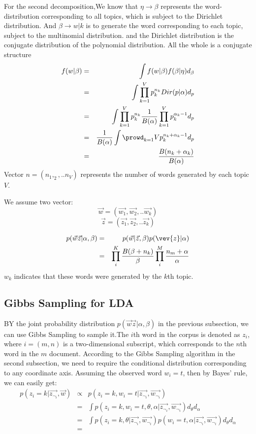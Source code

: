 For the second decomposition,We know that $\eta \rightarrow \beta$ represents the word-distribution corresponding to all topics, which is subject to the Dirichlet distribution. And $\beta  \rightarrow w|k $  is to generate the word corresponding to each topic, subject to the multinomial distribution. and the Dirichlet distribution is the conjugate distribution of the polynomial distribution. All the whole is a conjugate structure
\begin{eqnarray*}
  f(w|\beta) &=& \int f(w|\beta)f(\beta|\eta) d_{\beta} \\
              &=& \int \prod_{k=1}^V p_k^{n_k} Dir(p|\alpha) d_p \\
              &=& \int \prod_{k=1}^Vp_k^{n_k} \frac{1}{B(\alpha)}\prod_{k=1}^{V}p_k^{\alpha_k-1} d_p \\
              &=& \frac{1}{B(\alpha)}\int \prowd_{k=1}{V}p_k^{n_k+\alpha_k-1} d_p \\
              &=& \frac{B(n_k+\alpha_k)}{B(\alpha)}
\end{eqnarray*}
Vector $n = (n_1,_2,..n_V)$ represents the number of words generated by each topic $V$.

We assume two vector:
\[
  \vec{w} = (\vec{w_1},\vec{w_2},..\vec{w_k})
\]
\[
  \vec{z} = (\vec{z_1},\vec{z_2},..\vec{z_k})
\]


\begin{eqnarray*}
  p(\vec{w}\vec{z}|\alpha,\beta) & = & p(\vec{w}|\vec{z},\beta)p(\vev{z}|\alpha) \\
                                 & = & \prod_i^{K}\frac{B(\beta+n_k)}{\beta}\prod_i^M\frac{n_m+\alpha}{\alpha}
\end{eqnarray*}
$w_k$ indicates that these words were generated by the $k$th topic.

\subsection{Gibbs Sampling for LDA}
BY the joint probability distribution $p(\vec{w}\vec{z}|\alpha,\beta)$ in the previous subsection, we can use Gibbs Sampling to sample it.The $i$th word in the corpus  is denoted as $z_{i}$, where $i=(m,n)$ is a two-dimensional subscript, which corresponds to the $n$th word in the $m$ document. According to the Gibbs Sampling algorithm in the second subsection, we need to require the conditional distribution corresponding to any coordinate axis. Assuming the observed word $w_i=t$, then by Bayes' rule, we can easily get:
\begin{eqnarray*}
  p(z_i=k|\vec{z_{\neg_i}},\vec{w}) & \propto & p(z_i=k,w_i = t|\vec{z_{\neg_i}},\vec{w_{\neg_i}}) \\
  &=& \int p(z_i = k,w_i=t,\theta,\alpha|\vec{z_{\neg_i}},\vec{w_{\neg_i}})d_{\theta} d_{\alpha} \\
  &=& \int p(z_i=k,\theta|\vec{z_{\neg_i}},\vec{w_{\neg_i}}) p(w_i=t,\alpha|\vec{z_{\neg_i}},\vec{w_{\neg_i}})d_{\theta} d_{\alpha}\\
  &=&
\end{eqnarray*}

